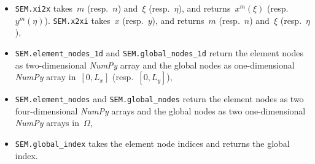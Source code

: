 \documentclass[10pt, ngerman, english,
twoside, open=right,
numbers=noenddot,
declaration=section,
abstract=section,
abstract=multiple,
abstract=notoc,
declaration=notoc,
cd=pale, 
chapterprefix=off, 
chapterpage=false, 
headingsvskip=-10em,
cdgeometry=custom, 
slantedgreek=on,
cdmath=on, 
cdfont=on,
ttfont=false,
mathswap=off,
]{tudscrreprt}
\numberwithin{equation}{chapter}
\begin{document}
\begin{itemize}
\item \texttt{SEM.xi2x} takes~$m$ (resp.~$n$) and~$\xi$ (resp.~$\eta$), and returns~$x^m(\xi)$ (resp.~$y^m(\eta)$). \texttt{SEM.x2xi} takes~$x$ (resp.~$y$), and returns~$m$ (resp.~$n$) and~$\xi$ (resp.~$\eta$),
\item \texttt{SEM.element\_nodes\_1d} and \texttt{SEM.global\_nodes\_1d} return the element nodes as two-dimensional \textit{NumPy} array and the global nodes as one-dimensional \textit{NumPy} array in~$[0, L_x]$ (resp.~$[0, L_y]$),
\item \texttt{SEM.element\_nodes} and \texttt{SEM.global\_nodes} return the element nodes as two four-dimensional \textit{NumPy} arrays and the global nodes as two one-dimensional \textit{NumPy} arrays in~$\Omega$,
\item \texttt{SEM.global\_index} takes the element node indices and returns the global index.
\end{itemize}
\par
\end{document}
